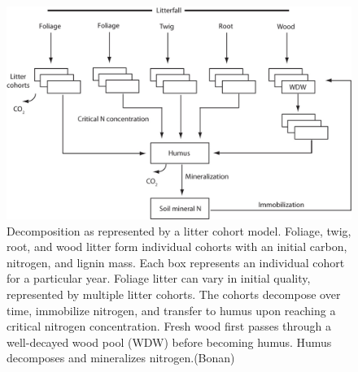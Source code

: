\documentclass[12pt,oneside]{book}
\begin{document}
\begin{figure}

{\centering \includegraphics[width=0.8\linewidth]{figures/chap5/f517_litter_cohort} 

}

\caption{Decomposition as represented by a litter cohort model. Foliage, twig, root, and wood litter form individual cohorts with an initial carbon, nitrogen, and lignin mass. Each box represents an individual cohort for a particular year. Foliage litter can vary in initial quality, represented by multiple litter cohorts. The cohorts decompose over time, immobilize nitrogen, and transfer to humus upon reaching a critical nitrogen concentration. Fresh wood first passes through a well-decayed wood pool (WDW) before becoming humus. Humus decomposes and mineralizes nitrogen.(Bonan)}\label{fig:f517}
\end{figure}
\end{document}
